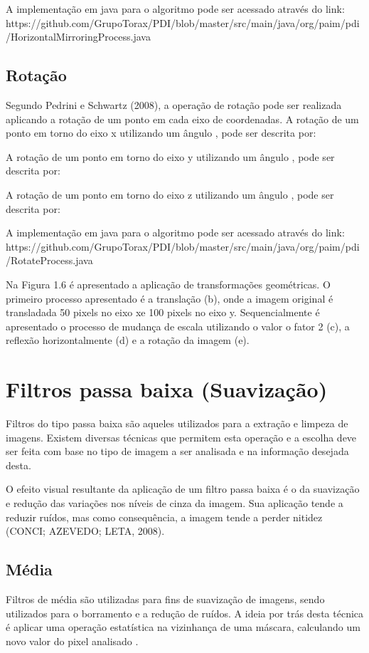 \documentclass[
	12pt,				%
	oneside,			%
	a4paper,			%
	english,			%
	french,				%
	spanish,			%
	brazil,				%
	]{abntex2}
\begin{document}
A implementação em java para o algoritmo pode ser acessado através do link:
https://github.com/GrupoTorax/PDI/blob/master/src/main/java/org/paim/pdi/HorizontalMirroringProcess.java 

\subsection{Rotação}

Segundo Pedrini e Schwartz (2008), a operação de rotação pode ser realizada aplicando a rotação de um ponto em cada eixo de coordenadas. A rotação de um ponto em torno do eixo x utilizando um ângulo , pode ser descrita por:

A rotação de um ponto em torno do eixo y utilizando um ângulo , pode ser descrita por:

A rotação de um ponto em torno do eixo z utilizando um ângulo , pode ser descrita por:

A implementação em java para o algoritmo pode ser acessado através do link: https://github.com/GrupoTorax/PDI/blob/master/src/main/java/org/paim/pdi/RotateProcess.java

Na Figura 1.6 é apresentado a aplicação de transformações geométricas. O primeiro processo apresentado é a translação (b), onde a imagem original é transladada 50 pixels no eixo xe 100 pixels no eixo y. Sequencialmente é apresentado o processo de mudança de escala utilizando o valor o fator 2 (c), a reflexão horizontalmente (d) e a rotação da imagem (e). 

\section{Filtros passa baixa (Suavização)}
Filtros do tipo passa baixa são aqueles utilizados para a extração e limpeza de imagens. Existem diversas técnicas que permitem esta operação e a escolha deve ser feita com base no tipo de imagem a ser analisada e na informação desejada desta. 

O efeito visual resultante da aplicação de um filtro passa baixa é o da suavização e redução das variações nos níveis de cinza da imagem. Sua aplicação tende a reduzir ruídos, mas como consequência, a imagem tende a perder nitidez (CONCI; AZEVEDO; LETA, 2008).

\subsection{Média}
Filtros de média são utilizadas para fins de suavização de imagens, sendo utilizados para o borramento e a redução de ruídos. A ideia por trás desta técnica é aplicar uma operação estatística na vizinhança de uma máscara, calculando um novo valor do pixel analisado \cite{gonzalesWoods:2008}. 
\end{document}
